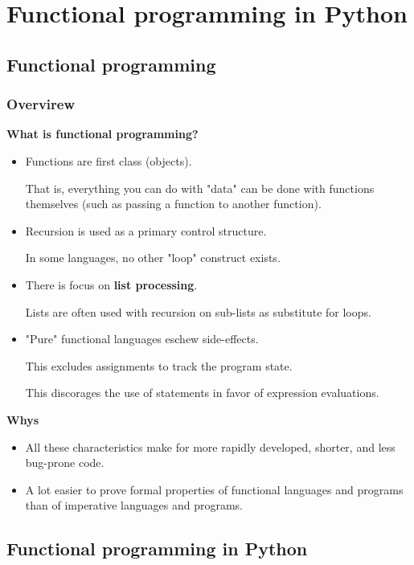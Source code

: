\section{Functional programming in Python}

\subsection{Functional programming}

\subsubsection{Overvirew}

\textbf{What is functional programming?}
\begin{itemize}
	\item Functions are first class (objects).

That is, everything you can do with "data" can be done with functions themselves (such as passing a function to another function).

	\item Recursion is used as a primary control structure.

In some languages, no other "loop" construct exists.

	\item There is focus on \textbf{list processing}.

Lists are often used with recursion on sub-lists as substitute for loops.

	\item "Pure" functional languages eschew side-effects.
	
This excludes assignments to track the program state.

This discorages the use of statements in favor of expression evaluations.
\end{itemize}

\textbf{Whys}

\begin{itemize}
	\item All these characteristics make for more rapidly developed, shorter, and less bug-prone code.
	\item A lot easier to prove formal properties of functional languages and programs than of imperative languages and programs.
\end{itemize}

\subsection{Functional programming in Python}

